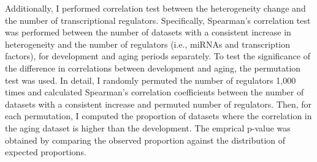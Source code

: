 Additionally, I performed correlation test between the heterogeneity change and the number of transcriptional regulators. 
Specifically, Spearman's correlation test was performed between the number of datasets with a consistent increase in heterogeneity and 
the number of regulators (i.e., miRNAs and transcription factors), for development and aging periods separately. 
To test the significance of the difference in correlations between development and aging, the permutation test was used.
In detail, I randomly permuted the number of regulators 1,000 times and 
calculated Spearman's correlation coefficients between the number of datasets with a consistent increase and permuted number of regulators.
Then, for each permutation, I computed the proportion of datasets where the correlation in the aging dataset is higher than the development.
The emprical p-value was obtained by comparing the observed proportion against the distribution of expected proportions.

